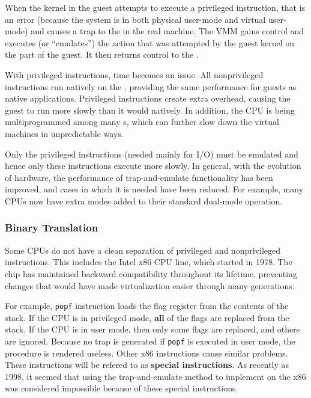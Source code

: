 When the kernel in the guest attempts to execute a privileged instruction, that is an error (because the system is in both physical user-mode and virtual user-mode) and causes a trap to the  in the real machine.
The VMM gains control and executes (or ``emulates'') the action that was attempted by the guest kernel on the part of the guest.
It then returns control to the .

With privileged instructions, time becomes an issue.
All nonprivileged instructions run natively on the , providing the same performance for guests as native applications.
Privileged instructions create extra overhead, causing the guest to run more slowly than it would natively.
In addition, the CPU is being multiprogrammed among many s, which can further slow down the virtual machines in unpredictable ways.

Only the privileged instructions (needed mainly for I/O) must be emulated and hence only these instructions execute more slowly.
In general, with the evolution of hardware, the performance of trap-and-emulate functionality has been improved, and cases in which it is needed have been reduced.
For example, many CPUs now have extra modes added to their standard dual-mode operation.

\subsubsection{Binary Translation}\label{subsubsec:Binary_Translation}
Some CPUs do not have a clean separation of privileged and nonprivileged instructions.
This includes the Intel x86 CPU line, which started in 1978.
The chip has maintained backward compatibility throughout its lifetime, preventing changes that would have made virtualization easier through many generations.

For example, \texttt{popf} instruction loads the flag register from the contents of the stack.
If the CPU is in privileged mode, \textbf{all} of the flags are replaced from the stack.
If the CPU is in user mode, then only some flags are replaced, and others are ignored.
Because no trap is generated if \texttt{popf} is executed in user mode, the  procedure is rendered useless.
Other x86 instructions cause similar problems.
These instructions will be refered to as \textbf{special instructions}.
As recently as 1998, it seemed that using the trap-and-emulate method to implement  on the x86 was considered impossible because of these special instructions.



